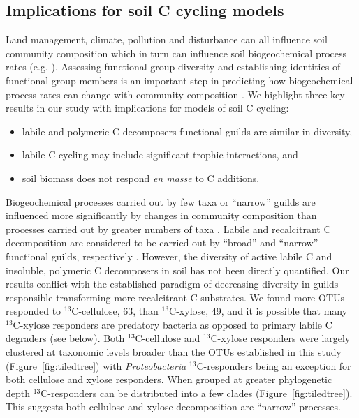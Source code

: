 \subsection{Implications for soil C cycling models}
Land management, climate, pollution and disturbance can all influence soil
community composition \citep{McGuire2010} which in turn can influence soil
biogeochemical process rates (e.g. \citep{Berlemont2014a}). Assessing
functional group diversity and establishing identities of functional group
members is an important step in predicting how biogeochemical process rates can
change with community composition \citep{Schimel_1995,McGuire2010}. We
highlight three key results in our study with implications for models of soil
C cycling: \begin{itemize} \item labile and polymeric C decomposers functional
guilds are similar in diversity, \item labile C cycling may include significant
trophic interactions, and \item soil biomass does not respond \textit{en masse}
to C additions.\end{itemize}

Biogeochemical processes carried out by few taxa or ``narrow'' guilds are
influenced more significantly by changes in community composition than
processes carried out by greater numbers of taxa
\citep{Schimel_1995,McGuire2010}. Labile and recalcitrant C decomposition are
considered to be carried out by ``broad'' and ``narrow'' functional guilds,
respectively \citep{Schimel_1995,McGuire2010}. However, the diversity of active
labile C and insoluble, polymeric C decomposers in soil has not been directly
quantified. Our results conflict with the established paradigm of decreasing
diversity in guilds responsible transforming more recalcitrant C substrates. We
found more OTUs responded to $^{13}$C-cellulose, 63, than $^{13}$C-xylose, 49,
and it is possible that many $^{13}$C-xylose responders are predatory bacteria
as opposed to primary labile C degraders (see below). Both $^{13}$C-cellulose
and $^{13}$C-xylose responders were largely clustered at taxonomic levels
broader than the OTUs established in this study (Figure~\ref{fig:tiledtree})
with \textit{Proteobacteria} $^{13}$C-responders being an exception for both
cellulose and xylose responders. When grouped at greater phylogenetic depth
$^{13}$C-responders can be distributed into a few clades
(Figure~\ref{fig:tiledtree}). This suggests both cellulose and xylose
decomposition are ``narrow'' processes.

